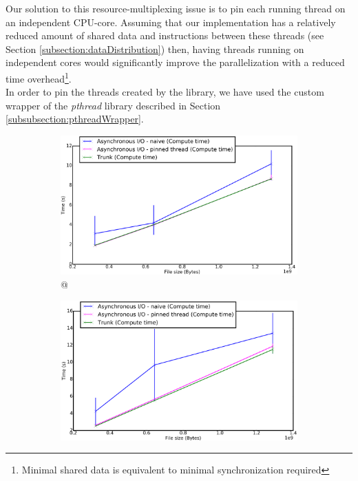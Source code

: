 		Our solution to this resource-multiplexing issue is to pin each running thread on an independent CPU-core.   Assuming that our implementation has a relatively reduced amount of shared data and instructions between these threads (see Section \ref{subsection:dataDistribution}) then, having threads running on independent cores would significantly improve the parallelization with a reduced time overhead\footnote{Minimal shared data is equivalent to minimal synchronization required}.\\
		In order to pin the threads created by the \notationaio\space library, we have used the custom wrapper of the \emph{pthread} library described in Section \ref{subsubsection:pthreadWrapper}.\\

			\begin{figure}[!h]
				\centering
				\begin{subfigure}[b]{0.475\textwidth}
					\centering
					\includegraphics[width=\textwidth]{charts/cubeRemapper_pthreadWrap_compute_workstation_8core.png}
					\caption[\targetPlatformLaptop \space @ \targetPlatformLaptopFrequency]
					{{\small \targetPlatformLaptop \space @ \targetPlatformLaptopFrequency}}
					\label{fig:cubeRemapper_pthreadWrap_compute_workstation}
				\end{subfigure}
				\hfill
				\begin{subfigure}[b]{0.475\textwidth}
					\centering
					\includegraphics[width=\textwidth]{charts/cubeRemapper_pthreadWrap_compute_hpc.png}

\end{subfigure}
\end{figure}
